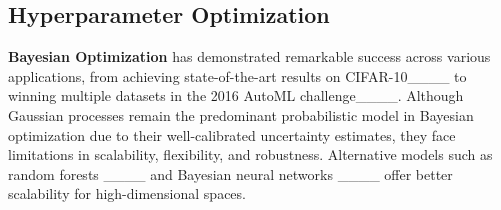 


\subsection{Hyperparameter Optimization}
\textbf{Bayesian Optimization} has demonstrated remarkable success across various applications, from achieving state-of-the-art results on CIFAR-10____ to winning multiple datasets in the 2016 AutoML challenge____. Although Gaussian processes remain the predominant probabilistic model in Bayesian optimization due to their well-calibrated uncertainty estimates, they face limitations in scalability, flexibility, and robustness. Alternative models such as random forests ____ and Bayesian neural networks ____ offer better scalability for high-dimensional spaces.

